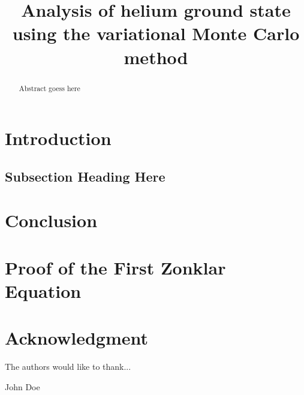 \documentclass[conference]{IEEEtran}
\begin{document}
\title{Analysis of helium ground state using the variational Monte Carlo method}


\author{
\and
{}
\and
{}
}


\maketitle


\begin{abstract}

Abstract goess here

\end{abstract}

\IEEEpeerreviewmaketitle



\section{Introduction}
\blindtext

\subsection{Subsection Heading Here}
\blindtext

\section{Conclusion}
\blindtext



\appendices
\section{Proof of the First Zonklar Equation}
\blindtext

\section*{Acknowledgment}


The authors would like to thank...

\ifCLASSOPTIONcaptionsoff
  \newpage
\fi




\begin{IEEEbiography}{John Doe}
\blindtext
\end{IEEEbiography}
\end{document}
